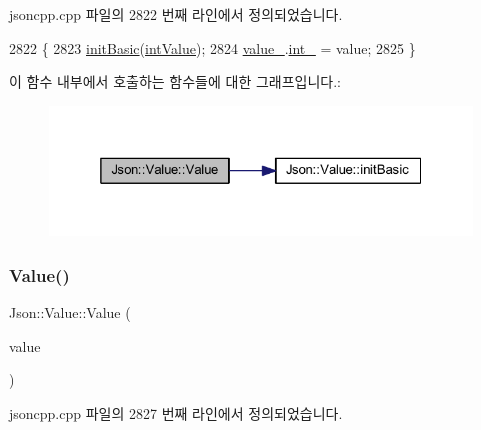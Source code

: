 jsoncpp.\+cpp 파일의 2822 번째 라인에서 정의되었습니다.


\begin{DoxyCode}
2822                       \{
2823   \hyperlink{class_json_1_1_value_a32b86b71564157f40f880f5736be822a}{initBasic}(\hyperlink{namespace_json_a7d654b75c16a57007925868e38212b4eae5a9d708d5c9e23ae9bf98898522512d}{intValue});
2824   \hyperlink{class_json_1_1_value_aef578244546212705b9f81eb84d7e151}{value\_}.\hyperlink{union_json_1_1_value_1_1_value_holder_adbfb384301298844ed955ba5cf6015a0}{int\_} = value;
2825 \}
\end{DoxyCode}
이 함수 내부에서 호출하는 함수들에 대한 그래프입니다.\+:\nopagebreak
\begin{figure}[H]
\begin{center}
\leavevmode
\includegraphics[width=325pt]{class_json_1_1_value_a4744ae571fcf34f4b16a2257b3b3b585_cgraph}
\end{center}
\end{figure}
\mbox{\label{class_json_1_1_value_ae67a857b01286e3499a87e95be848d20}} 
\subsubsection{\texorpdfstring{Value()}{Value()}\hspace{0.1cm}{\footnotesize\ttfamily [3/12]}}
{\footnotesize\ttfamily Json\+::\+Value\+::\+Value (\begin{DoxyParamCaption}\item[{\hyperlink{class_json_1_1_value_a0933d59b45793ae4aade1757c322a98d}{U\+Int}}]{value }\end{DoxyParamCaption})}



jsoncpp.\+cpp 파일의 2827 번째 라인에서 정의되었습니다.


